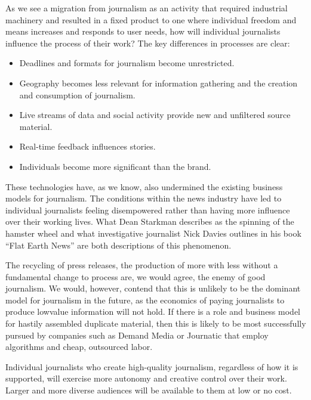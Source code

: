 As we see a migration from journalism as an activity that required industrial
machinery and resulted in a fixed product to one where individual freedom and
means increases and responds to user needs, how will individual journalists influence
the process of their work? The key differences in processes are clear:
\begin{itemize}
\item Deadlines and formats for journalism become unrestricted.
\item Geography becomes less relevant for information gathering and the
creation and consumption of journalism.
\item Live streams of data and social activity provide new and unfiltered
source material.
\item Real-time feedback influences stories.
\item Individuals become more significant than the brand.
\end{itemize}

These technologies have, as we know, also undermined the existing business
models for journalism. The conditions within the news industry have led to
individual journalists feeling disempowered rather than having more influence
over their working lives. What Dean Starkman describes as the spinning of the
hamster wheel and what investigative journalist Nick Davies outlines in his book
``Flat Earth News'' are both descriptions of this phenomenon.

The recycling of press releases, the production of more with less without a fundamental
change to process are, we would agree, the enemy of good journalism.
We would, however, contend that this is unlikely to be the dominant model for
journalism in the future, as the economics of paying journalists to produce lowvalue
information will not hold. If there is a role and business model for hastily
assembled duplicate material, then this is likely to be most successfully pursued
by companies such as Demand Media or Journatic that employ algorithms and
cheap, outsourced labor.

Individual journalists who create high-quality journalism, regardless of how it
is supported, will exercise more autonomy and creative control over their work.
Larger and more diverse audiences will be available to them at low or no cost.

